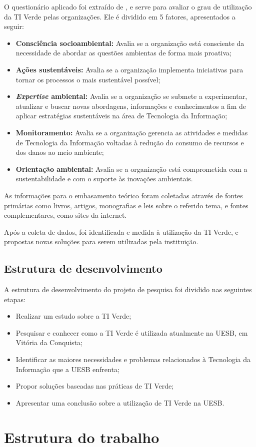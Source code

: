 O questionário aplicado foi extraído de , e serve para avaliar o grau de utilização da TI Verde pelas organizações. Ele é dividido em 5 fatores, apresentados a seguir: 
\begin{itemize}
    \item  \textbf{Consciência socioambiental:} Avalia se a organização está consciente da necessidade de abordar as questões ambientas de forma mais proativa;
    \item \textbf{Ações sustentáveis:} Avalia se a organização implementa iniciativas para tornar os processos o mais sustentável possível;
    \item \textbf{\textit{Expertise} ambiental:} Avalia se a organização se submete a experimentar, atualizar e buscar novas abordagens, informações e conhecimentos a fim de aplicar estratégias sustentáveis na área de Tecnologia da Informação;
    \item \textbf{Monitoramento:} Avalia se a organização gerencia as atividades e medidas de Tecnologia da Informação voltadas à redução do consumo de recursos e dos danos ao meio ambiente;
    \item \textbf{Orientação ambiental:} Avalia se a organização está comprometida com a sustentabilidade e com o suporte às inovações ambientais.
\end{itemize}

As informações para o embasamento teórico foram coletadas através de fontes primárias como livros, artigos, monografias e leis sobre o referido tema, e fontes complementares, como sites da internet. 

Após a coleta de dados, foi identificada e medida à utilização da TI Verde, e propostas novas soluções para serem utilizadas pela instituição.

\subsection{Estrutura de desenvolvimento}
A estrutura de desenvolvimento do projeto de pesquisa foi dividido nas seguintes etapas:

\begin{itemize}
  \item Realizar um estudo sobre a TI Verde;
  \item Pesquisar e conhecer como a TI Verde é utilizada atualmente na UESB, em Vitória da Conquista;
  \item Identificar as maiores necessidades e problemas relacionados à Tecnologia da Informação que a UESB enfrenta;
  \item Propor soluções baseadas nas práticas de TI Verde;
  \item Apresentar uma conclusão sobre a utilização de TI Verde na UESB.
\end{itemize}


\section{Estrutura do trabalho}